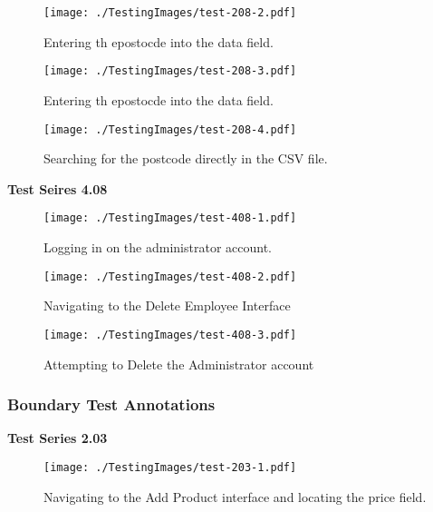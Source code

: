 \begin{figure}[H]
    \texttt{[image: ./TestingImages/test-208-2.pdf]}
    \caption{Entering th epostocde into the data field.}  \label{fig:test-208-2}
\end{figure}

\begin{figure}[H]
    \texttt{[image: ./TestingImages/test-208-3.pdf]}
    \caption{Entering th epostocde into the data field.}  \label{fig:test-208-3}
\end{figure}

\begin{figure}[H]
    \texttt{[image: ./TestingImages/test-208-4.pdf]}
    \caption{Searching for the postcode directly in the CSV file.}  \label{fig:test-208-4}
\end{figure}

\pagebreak

\textbf{Test Seires 4.08}

\begin{figure}[H]
    \texttt{[image: ./TestingImages/test-408-1.pdf]}
    \caption{Logging in on the administrator account.}  \label{fig:test-408-1}
\end{figure}

\begin{figure}[H]
    \texttt{[image: ./TestingImages/test-408-2.pdf]}
    \caption{Navigating to the Delete Employee Interface}  \label{fig:test-408-2}
\end{figure}

\begin{figure}[H]
    \texttt{[image: ./TestingImages/test-408-3.pdf]}
    \caption{Attempting to Delete the Administrator account}  \label{fig:test-408-3}
\end{figure}

\pagebreak

\subsubsection{Boundary Test Annotations}

\textbf{Test Series 2.03}

\begin{figure}[H]
    \texttt{[image: ./TestingImages/test-203-1.pdf]}
    \caption{Navigating to the Add Product interface and locating the price field.}  \label{fig:test-203-1}
\end{figure}

